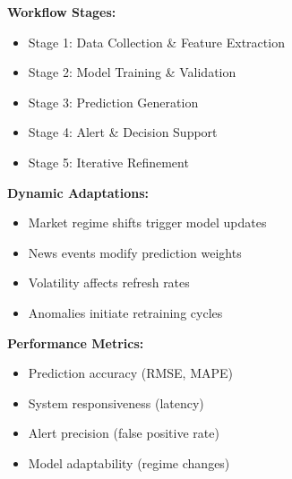 \begin{table}[th!]
\begin{small}
{\begin{minipage}{0.45\textwidth}
\textbf{Workflow Stages:}
\begin{itemize}[leftmargin=1em, topsep=-.1pt, itemsep=-.1pt, label=-]
\item Stage 1: Data Collection \& Feature Extraction
\item Stage 2: Model Training \& Validation
\item Stage 3: Prediction Generation
\item Stage 4: Alert \& Decision Support
\item Stage 5: Iterative Refinement
\end{itemize}

\textbf{Dynamic Adaptations:}
\begin{itemize}[leftmargin=1em, topsep=-.1pt, itemsep=-.1pt, label=-]
\item Market regime shifts trigger model updates
\item News events modify prediction weights
\item Volatility affects refresh rates
\item Anomalies initiate retraining cycles
\end{itemize}

\textbf{Performance Metrics:}
\begin{itemize}[leftmargin=1em, topsep=-.1pt, itemsep=-.1pt, label=-]
\item Prediction accuracy (RMSE, MAPE)
\item System responsiveness (latency)
\item Alert precision (false positive rate)
\item Model adaptability (regime changes)
\end{itemize}
\end{minipage}
}
\end{small}
\label{tab:StockPrediction}
\end{table}


\begin{comment}


\end{comment}
